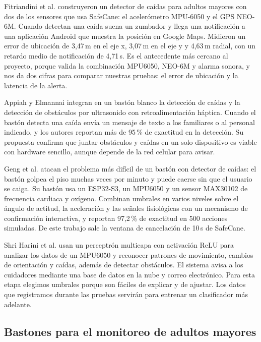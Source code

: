 \documentclass[conference,a4paper]{IEEEtran}
\begin{document}
Fitriandini et al. \cite{fitriandini} construyeron un detector de caídas para adultos mayores con dos de los sensores que usa SafeCane: el acelerómetro MPU-6050 y el GPS NEO-6M. Cuando detectan una caída suena un zumbador y llega una notificación a una aplicación Android que muestra la posición en Google Maps. Midieron un error de ubicación de 3,47\,m en el eje x, 3,07\,m en el eje y y 4,63\,m radial, con un retardo medio de notificación de 4,71\,s. Es el antecedente más cercano al proyecto, porque valida la combinación MPU6050, NEO-6M y alarma sonora, y nos da dos cifras para comparar nuestras pruebas: el error de ubicación y la latencia de la alerta.

Appiah y Elmannai \cite{appiah} integran en un bastón blanco la detección de caídas y la detección de obstáculos por ultrasonido con retroalimentación háptica. Cuando el bastón detecta una caída envía un mensaje de texto a los familiares o al personal indicado, y los autores reportan más de 95\,\% de exactitud en la detección. Su propuesta confirma que juntar obstáculos y caídas en un solo dispositivo es viable con hardware sencillo, aunque depende de la red celular para avisar.

Geng et al. \cite{geng} atacan el problema más difícil de un bastón con detector de caídas: el bastón golpea el piso muchas veces por minuto y puede caerse sin que el usuario se caiga. Su bastón usa un ESP32-S3, un MPU6050 y un sensor MAX30102 de frecuencia cardiaca y oxígeno. Combinan umbrales en varios niveles sobre el ángulo de actitud, la aceleración y las señales fisiológicas con un mecanismo de confirmación interactiva, y reportan 97,2\,\% de exactitud en 500 acciones simuladas. De este trabajo sale la ventana de cancelación de 10\,s de SafeCane.

Shri Harini et al. \cite{shriharini} usan un perceptrón multicapa con activación ReLU para analizar los datos de un MPU6050 y reconocer patrones de movimiento, cambios de orientación y caídas, además de detectar obstáculos. El sistema avisa a los cuidadores mediante una base de datos en la nube y correo electrónico. Para esta etapa elegimos umbrales porque son fáciles de explicar y de ajustar. Los datos que registramos durante las pruebas servirán para entrenar un clasificador más adelante.

\subsection{Bastones para el monitoreo de adultos mayores}
\end{document}

